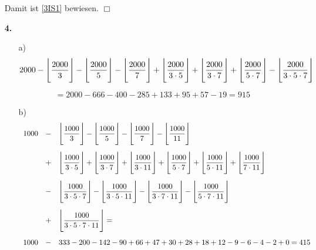\documentclass[a4paper,10pt]{scrartcl}
\begin{document}
\begin{enumerate}
            Damit ist \eqref{3IS1} bewiesen. $\Box$

    \item[\textbf{4.}]
        \begin{enumerate}
            \item[a)]
                $$2000 - \FF{2000}{3} - \FF{2000}{5} - \FF{2000}{7} + \FF{2000}{3 \cdot 5} + \FF{2000}{3 \cdot 7} + \FF{2000}{5 \cdot 7}
                - \FF{2000}{3 \cdot 5 \cdot 7}$$

                $$= 2000 - 666 - 400 - 285 + 133 + 95 + 57 - 19 = 915$$

            \item[b)]
                $$\begin{array}{rcl}
                   1000 &-& \FF{1000}{3} - \FF{1000}{5} - \FF{1000}{7} - \FF{1000}{11}\\[1.8em]
                &+& \FF{1000}{3 \cdot 5} + \FF{1000}{3 \cdot 7} + \FF{1000}{3 \cdot 11}
                + \FF{1000}{5 \cdot 7} + \FF{1000}{5 \cdot 11} + \FF{1000}{7 \cdot 11}\\[1.8em]
                &-& \FF{1000}{3 \cdot 5 \cdot 7} - \FF{1000}{3 \cdot 5 \cdot 11}
                - \FF{1000}{3 \cdot 7 \cdot 11} - \FF{1000}{5 \cdot 7 \cdot 11}\\[1.8em]
                &+& \FF{1000}{3 \cdot 5 \cdot 7 \cdot 11} = \\[1.8em]
                1000 &-& 333 - 200 - 142 - 90 + 66 + 47 + 30 + 28 + 18 + 12 - 9 - 6 - 4 - 2 + 0 = 415
                \end{array}$$

        \end{enumerate}
\end{enumerate}
\end{document}
